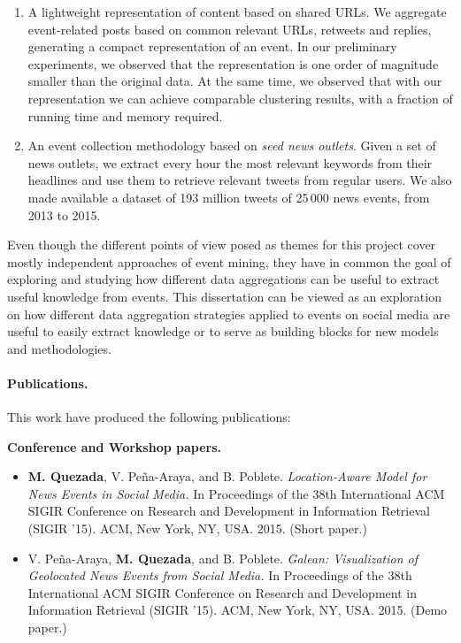 \begin{intro}
\begin{enumerate}
\item A lightweight representation of content based on shared URLs.
%
We aggregate event-related posts based on common relevant URLs, retweets and
replies, generating a compact representation of an event.
%
In our preliminary experiments, we observed that the representation is one order
of magnitude smaller than the original data.
%
At the same time, we observed that with our representation we can achieve
comparable clustering results, with a fraction of running time and memory
required.

\item An event collection methodology based on {\em seed news outlets}.
%
Given a set of news outlets, we extract every hour the most relevant keywords
from their headlines and use them to retrieve relevant tweets from regular
users.
%
We also made available a dataset of 193 million tweets of 25\,000 news events,
from 2013 to 2015.
\end{enumerate}

Even though the different points of view posed as themes for this project cover
mostly independent approaches of event mining, they have in common the goal of
exploring and studying how different data aggregations can be useful to extract
useful knowledge from events. 
%
This dissertation can be viewed as an exploration on how different data
aggregation strategies applied to events on social media are useful to easily
extract knowledge or to serve as building blocks for new models and
methodologies.




\paragraph{Publications.} This work have produced the following publications:

{\bf Conference and Workshop papers.}

\begin{itemize}
    \item {\bf M. Quezada}, V. Peña-Araya, and B. Poblete. {\em Location-Aware
    Model for News Events in Social Media.} In Proceedings of the 38th
    International ACM SIGIR Conference on Research and Development in
    Information Retrieval (SIGIR '15). ACM, New York, NY, USA. 2015.
    (Short paper.)

    \item V. Peña-Araya, {\bf M. Quezada}, and B. Poblete. {\em Galean:
    Visualization of Geolocated News Events from Social Media.} In Proceedings
    of the 38th International ACM SIGIR Conference on Research and Development
    in Information Retrieval (SIGIR '15). ACM, New York, NY, USA. 2015.
    (Demo paper.)
\end{itemize}


\end{intro}
